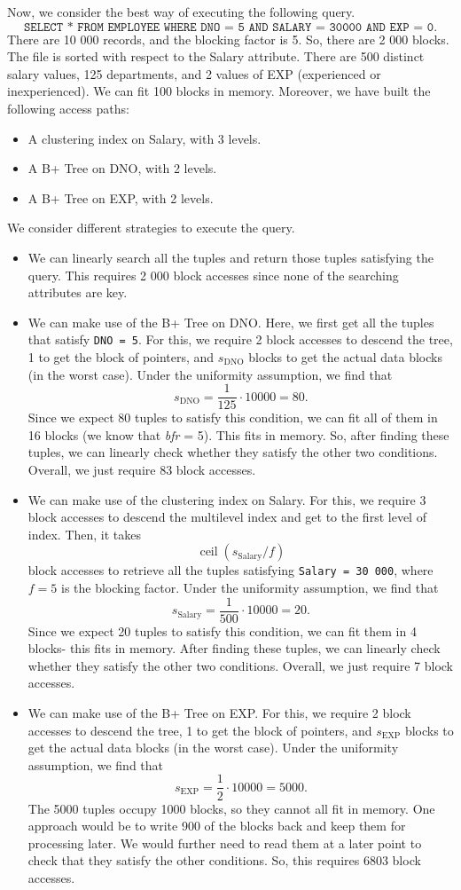 \documentclass[a4paper, openany]{memoir}
\theoremstyle{definition}
\theoremstyle{plain}
\begin{document}
Now, we consider the best way of executing the following query.
\[\texttt{SELECT * FROM EMPLOYEE WHERE DNO = 5 AND SALARY = 30000 AND EXP = 0}.\]
There are 10 000 records, and the blocking factor is 5. So, there are 2 000 blocks. The file is sorted with respect to the Salary attribute. There are 500 distinct salary values, 125 departments, and 2 values of EXP (experienced or inexperienced). We can fit 100 blocks in memory. Moreover, we have built the following access paths:
\begin{itemize}
    \item A clustering index on Salary, with 3 levels.
    \item A B+ Tree on DNO, with 2 levels.
    \item A B+ Tree on EXP, with 2 levels.
\end{itemize}
We consider different strategies to execute the query.
\begin{itemize}
    \item We can linearly search all the tuples and return those tuples satisfying the query. This requires 2 000 block accesses since none of the searching attributes are key.
    \item We can make use of the B+ Tree on DNO. Here, we first get all the tuples that satisfy \texttt{DNO = 5}. For this, we require 2 block accesses to descend the tree, 1 to get the block of pointers, and $s_{\text{DNO}}$ blocks to get the actual data blocks (in the worst case). Under the uniformity assumption, we find that
    \[s_{\text{DNO}} = \frac{1}{125} \cdot 10000 = 80.\]
    Since we expect 80 tuples to satisfy this condition, we can fit all of them in 16 blocks (we know that \textit{bfr} = 5). This fits in memory. So, after finding these tuples, we can linearly check whether they satisfy the other two conditions. Overall, we just require 83 block accesses.
    \item We can make use of the clustering index on Salary. For this, we require 3 block accesses to descend the multilevel index and get to the first level of index. Then, it takes
    \[\operatorname{ceil}(s_{\text{Salary}}/f)\]
    block accesses to retrieve all the tuples satisfying \texttt{Salary = 30 000}, where $f = 5$ is the blocking factor. Under the uniformity assumption, we find that
    \[s_{\text{Salary}} = \frac{1}{500} \cdot 10000 = 20.\]
    Since we expect 20 tuples to satisfy this condition, we can fit them in 4 blocks- this fits in memory. After finding these tuples, we can linearly check whether they satisfy the other two conditions. Overall, we just require 7 block accesses.
    \item We can make use of the B+ Tree on EXP. For this, we require 2 block accesses to descend the tree, 1 to get the block of pointers, and $s_{\text{EXP}}$ blocks to get the actual data blocks (in the worst case). Under the uniformity assumption, we find that
    \[s_{\text{EXP}} = \frac{1}{2} \cdot 10000 = 5000.\]
    The 5000 tuples occupy 1000 blocks, so they cannot all fit in memory. One approach would be to write 900 of the blocks back and keep them for processing later. We would further need to read them at a later point to check that they satisfy the other conditions. So, this requires 6803 block accesses.
\end{itemize}
\end{document}
